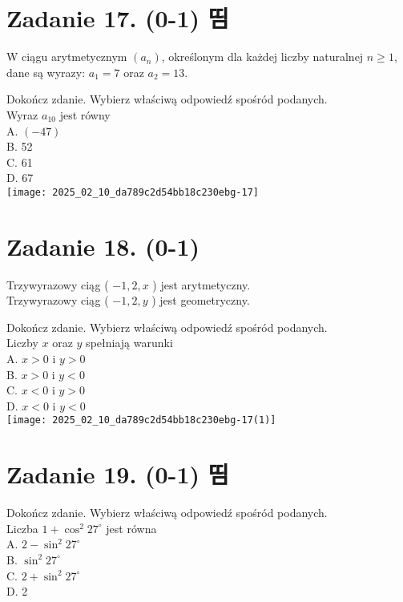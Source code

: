 \documentclass[10pt]{article}
\begin{document}
\section*{Zadanie 17. (0-1) 띰}
W ciągu arytmetycznym \(\left(a_{n}\right)\), określonym dla każdej liczby naturalnej \(n \geq 1\), dane są wyrazy: \(a_{1}=7\) oraz \(a_{2}=13\).

Dokończ zdanie. Wybierz właściwą odpowiedź spośród podanych.\\
Wyraz \(a_{10}\) jest równy\\
A. \((-47)\)\\
B. 52\\
C. 61\\
D. 67\\
\texttt{[image: 2025\_02\_10\_da789c2d54bb18c230ebg-17]}

\section*{Zadanie 18. (0-1)}
Trzywyrazowy ciąg ( \(-1,2, x\) ) jest arytmetyczny.\\
Trzywyrazowy ciąg ( \(-1,2, y\) ) jest geometryczny.

Dokończ zdanie. Wybierz właściwą odpowiedź spośród podanych.\\
Liczby \(x\) oraz \(y\) spełniają warunki\\
A. \(x>0\) i \(y>0\)\\
B. \(x>0\) i \(y<0\)\\
C. \(x<0\) i \(y>0\)\\
D. \(x<0\) i \(y<0\)\\
\texttt{[image: 2025\_02\_10\_da789c2d54bb18c230ebg-17(1)]}

\section*{Zadanie 19. (0-1) 띰}
Dokończ zdanie. Wybierz właściwą odpowiedź spośród podanych.\\
Liczba \(1+\cos ^{2} 27^{\circ}\) jest równa\\
A. \(2-\sin ^{2} 27^{\circ}\)\\
B. \(\sin ^{2} 27^{\circ}\)\\
C. \(2+\sin ^{2} 27^{\circ}\)\\
D. 2
\end{document}

